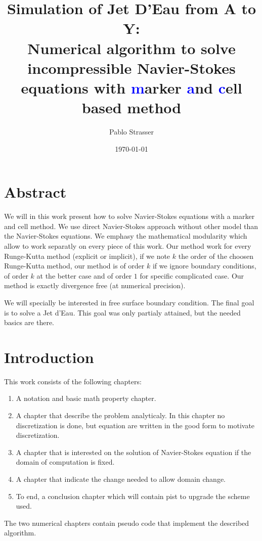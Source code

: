 \documentclass[a4paper]{master}
\title{Simulation of Jet D'Eau from A to Y:\\ Numerical algorithm to solve incompressible Navier-Stokes equations
with \textcolor{blue}{m}arker \textcolor{blue}{a}nd \textcolor{blue}{c}ell based method}
\author{Pablo Strasser}
\date{\today}
\begin{document}
\captionsetup{singlelinecheck=off,margin=10pt,font=small,labelfont=bf}
\maketitle
\dominitoc

\chapter*{Abstract}

\mtcaddchapter[Abstract]

We will in this work present how to solve Navier-Stokes equations with a marker and cell method.
We use direct Navier-Stokes approach without other model than the Navier-Stokes equations.
We emphasy the mathematical modularity which allow to work separatly on every piece of this work.
Our method work for every Runge-Kutta method (explicit or implicit), if we note $k$ the order of the choosen Runge-Kutta method,
our method is of order $k$ if we ignore boundary conditions, of order $k$ at the better case and of order $1$ for specific complicated case.
Our method is exactly divergence free (at numerical precision).

We will specially be interested in free surface boundary condition. The final goal is to solve a Jet d'Eau.
This goal was only partialy attained, but the needed basics are there. 


\tableofcontents

\chapter*{Introduction}

\mtcaddchapter[Introduction]

This work consists of the following chapters:
\begin{enumerate}
 \item A notation and basic math property chapter.
 \item A chapter that describe the problem analyticaly. In this chapter no discretization is done, but equation are written in the good form to motivate discretization.
 \item A chapter that is interested on the solution of Navier-Stokes equation if the domain of computation is fixed.
 \item A chapter that indicate the change needed to allow domain change.
 \item To end, a conclusion chapter which will contain pist to upgrade the scheme used.
\end{enumerate}

The two numerical chapters contain pseudo code that implement the described algorithm.









\nocite{*}

\end{document}

